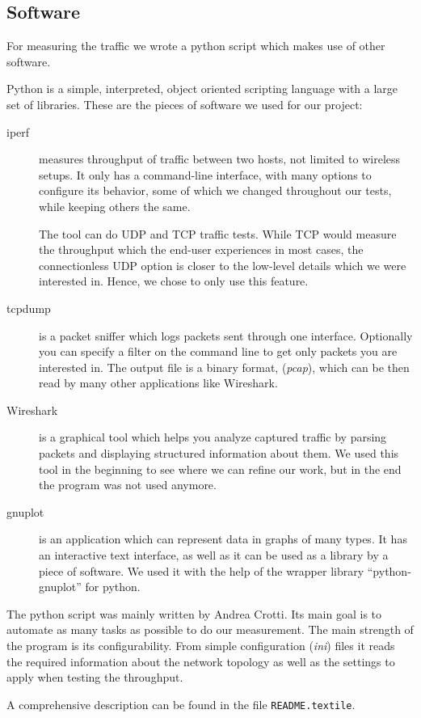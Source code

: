 \subsection{Software} \label{setup:software}



\noindent
For measuring the traffic we wrote a python script which makes use of other software.

Python is a simple, interpreted, object oriented scripting language with a large set of libraries.
These are the pieces of software we used for our project:

\begin{description}
	\item[iperf]
		measures throughput of traffic between two hosts, not limited to wireless setups.
		It only has a command-line interface, with many options to configure its behavior, some of which we changed throughout our tests, while keeping others the same.

		The tool can do UDP and TCP traffic tests.
		While TCP would measure the throughput which the end-user experiences in most cases, the connectionless UDP option is closer to the low-level details which we were interested in. Hence, we chose to only use this feature.


	\item[tcpdump]
		is a packet sniffer which logs packets sent through one interface. Optionally you can specify a filter on the command line to get only packets you are interested in.
		The output file is a binary format, ({\em pcap}), which can be then read by many other applications like Wireshark.
		
	\item[Wireshark]
		is a graphical tool which helps you analyze captured traffic by parsing packets and displaying structured information about them.
		We used this tool in the beginning to see where we can refine our work, but in the end the program was not used anymore.

	\item[gnuplot]
		is an application which can represent data in graphs of many types. It has an interactive text interface, as well as it can be used as a library by a piece of software. We used it with the help of the wrapper library ``python-gnuplot'' for python.

\end{description}
%
The python script was mainly written by Andrea Crotti.  Its main goal is to
automate as many tasks as possible to do our measurement.  The main strength
of the program is its configurability.  From simple configuration ({\em ini})
files it reads the required information about the network topology as well as
the settings to apply when testing the throughput.

A comprehensive description can be found in the file {\tt README.textile}.
